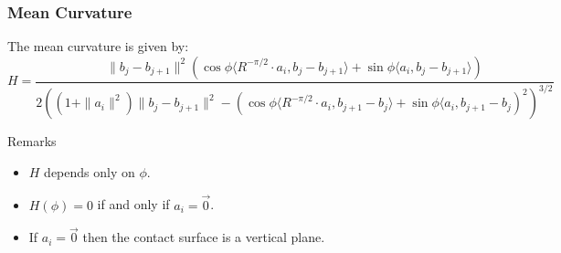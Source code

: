 \documentclass[ucs,9pt,pagenumbersfull]{beamer}
\begin{document}
\begin{frame}
  \frametitle{Mean Curvature}
  The mean curvature is given by:
\small{
  \[
  H=\frac{\|b_j-b_{j+1}\|^2\left( \cos \phi \langle R^{-\pi/2}\cdot
      a_i,b_j-b_{j+1} \rangle +\sin \phi \langle
      a_i,b_j-b_{j+1}\rangle\right)}{2\left(
      \left(1+\|a_i\|^2\right)\|b_j-b_{j+1}\|^2-
\left(\cos \phi \langle R^{-\pi/2}\cdot a_i , b_{j+1}-b_j \rangle + \sin
\phi \langle a_i, b_{j+1}-b_j\right)^2 \right)^{3/2}}
  \]}

\begin{block}{Remarks}
  \begin{itemize}
  \item \(H\) depends only on \(\phi\).
  \item \(H(\phi) = 0\) if and only if \(a_i =\vec{0}\).
  \item If \(a_i=\vec{0}\) then the contact surface is a vertical plane.
  \end{itemize}
\end{block}
\end{frame}
\end{document}
